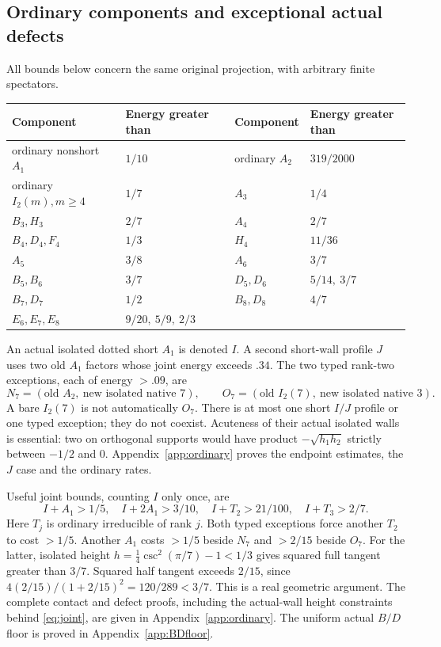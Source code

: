 \documentclass[11pt]{article}
\theoremstyle{definition}
\theoremstyle{remark}
\begin{document}
\subsection{Ordinary components and exceptional actual defects}
All bounds below concern the same original projection, with
arbitrary finite spectators.
\begin{center}\small
\begin{tabular}{ll@{\qquad}ll}
\toprule
Component&Energy greater than&Component&Energy greater than\\ \midrule
ordinary nonshort \(A_1\)&\(1/10\)&ordinary \(A_2\)&\(319/2000\)\\
ordinary \(I_2(m),m\geq4\)&\(1/7\)&\(A_3\)&\(1/4\)\\
\(B_3,H_3\)&\(2/7\)&\(A_4\)&\(2/7\)\\
\(B_4,D_4,F_4\)&\(1/3\)&\(H_4\)&\(11/36\)\\
\(A_5\)&\(3/8\)&\(A_6\)&\(3/7\)\\
\(B_5,B_6\)&\(3/7\)&\(D_5,D_6\)&\(5/14,\ 3/7\)\\
\(B_7,D_7\)&\(1/2\)&\(B_8,D_8\)&\(4/7\)\\
\(E_6,E_7,E_8\)&\(9/20,\ 5/9,\ 2/3\)&&\\ \bottomrule
\end{tabular}
\end{center}
An actual isolated dotted short \(A_1\) is denoted \(I\).
A second short-wall profile \(J\) uses two old \(A_1\) factors
whose joint energy exceeds \(.34\).
The two typed rank-two exceptions, each of energy \(>.09\), are
\[
 N_7=(\text{old }A_2,\ \text{new isolated native }7),\qquad
 O_7=(\text{old }I_2(7),\ \text{new isolated native }3).
\]
A bare \(I_2(7)\) is not automatically \(O_7\).
There is at most one short \(I/J\) profile or one typed exception;
they do not coexist. Acuteness of their actual isolated walls
is essential: two on orthogonal supports would have product
\(-\sqrt{h_1h_2}\) strictly between \(-1/2\) and \(0\).
Appendix~\ref{app:ordinary} proves the endpoint estimates,
the \(J\) case and the ordinary rates.

Useful joint bounds, counting \(I\) only once, are
\begin{equation}
\label{eq:joint}
 I+A_1>1/5,\quad I+2A_1>3/10,\quad
 I+T_2>21/100,\quad I+T_3>2/7.
\end{equation}
Here \(T_j\) is ordinary irreducible of rank \(j\).
Both typed exceptions force another \(T_2\) to cost \(>1/5\).
Another \(A_1\) costs \(>1/5\) beside \(N_7\) and \(>2/15\)
beside \(O_7\). For the latter, isolated height
\(h=\tfrac14\csc^2(\pi/7)-1<1/3\) gives squared full tangent
greater than \(3/7\). Squared half tangent exceeds \(2/15\),
since \(4(2/15)/(1+2/15)^2=120/289<3/7\).
This is a real geometric argument.
The complete contact and defect proofs, including the actual-wall
height constraints behind \eqref{eq:joint}, are given in
Appendix~\ref{app:ordinary}. The uniform actual \(B/D\) floor
is proved in Appendix~\ref{app:BDfloor}.
\end{document}
